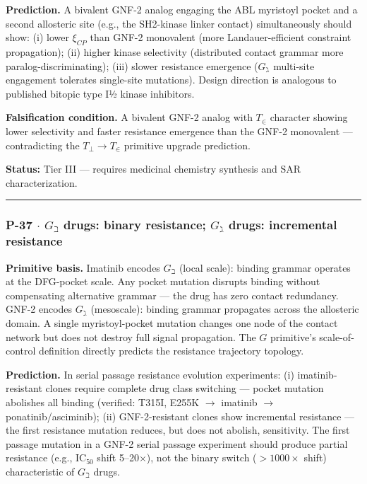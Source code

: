 \documentclass[12pt,a4paper]{article}
\begin{document}
\textbf{Prediction.} A bivalent GNF-2 analog engaging the ABL myristoyl pocket and a second allosteric site (e.g., the SH2-kinase linker contact) simultaneously should show: (i) lower $\xi_{CP}$ than GNF-2 monovalent (more Landauer-efficient constraint propagation); (ii) higher kinase selectivity (distributed contact grammar more paralog-discriminating); (iii) slower resistance emergence ($G_\gimel$ multi-site engagement tolerates single-site mutations). Design direction is analogous to published bitopic type I½ kinase inhibitors.

\textbf{Falsification condition.} A bivalent GNF-2 analog with $T_\in$ character showing lower selectivity and faster resistance emergence than the GNF-2 monovalent --- contradicting the $T_\perp \to T_\in$ primitive upgrade prediction.

\textbf{Status:} Tier III --- requires medicinal chemistry synthesis and SAR characterization.

\begin{center}
\rule{0.5\textwidth}{0.4pt}
\end{center}

\subsubsection{P-37 $\cdot$ $G_\beth$ drugs: binary resistance; $G_\gimel$ drugs: incremental resistance}

\textbf{Primitive basis.} Imatinib encodes $G_\beth$ (local scale): binding grammar operates at the DFG-pocket scale. Any pocket mutation disrupts binding without compensating alternative grammar --- the drug has zero contact redundancy. GNF-2 encodes $G_\gimel$ (mesoscale): binding grammar propagates across the allosteric domain. A single myristoyl-pocket mutation changes one node of the contact network but does not destroy full signal propagation. The $G$ primitive's scale-of-control definition directly predicts the resistance trajectory topology.

\textbf{Prediction.} In serial passage resistance evolution experiments: (i) imatinib-resistant clones require complete drug class switching --- pocket mutation abolishes all binding (verified: T315I, E255K $\rightarrow$ imatinib $\to$ ponatinib/asciminib); (ii) GNF-2-resistant clones show incremental resistance --- the first resistance mutation reduces, but does not abolish, sensitivity. The first passage mutation in a GNF-2 serial passage experiment should produce partial resistance (e.g., $\text{IC}_{50}$ shift 5--20$\times$), not the binary switch ($> 1000\times$ shift) characteristic of $G_\beth$ drugs.
\end{document}
